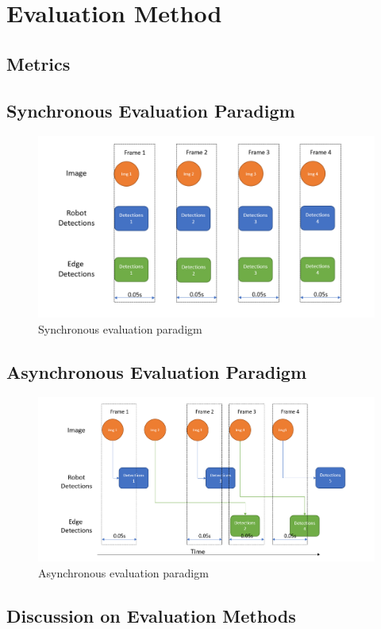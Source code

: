 \section{Evaluation Method}\label{sec:general_setup:evaluation}

\subsection{Metrics}


\subsection{Synchronous Evaluation Paradigm}

\begin{figure}[htp]
    \centering
    \includegraphics[width=120mm]{figures/setup/sync_eval.png}
    \caption{Synchronous evaluation paradigm}
    \label{fig:sync_eval}
\end{figure}

\subsection{Asynchronous Evaluation Paradigm}

\begin{figure}[htp]
    \centering
    \includegraphics[width=120mm]{figures/setup/async_eval.png}
    \caption{Asynchronous evaluation paradigm}
    \label{fig:async_eval}
\end{figure}

\subsection{Discussion on Evaluation Methods}